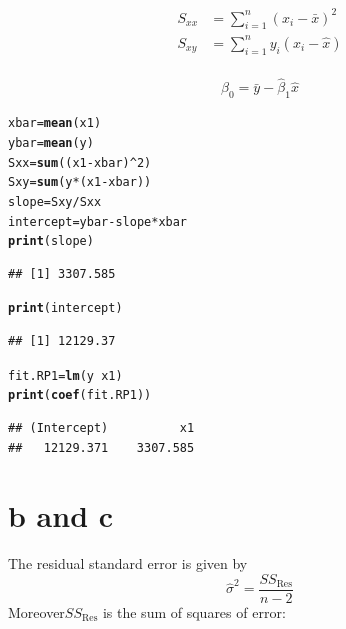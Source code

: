 \documentclass{article}\usepackage[]{graphicx}\usepackage[]{color}
\makeatletter
\newcommand{\hlnum}[1]{\textcolor[rgb]{0.686,0.059,0.569}{#1}}%
\newcommand{\hlopt}[1]{\textcolor[rgb]{0,0,0}{#1}}%
\newcommand{\hlstd}[1]{\textcolor[rgb]{0.345,0.345,0.345}{#1}}%
\newcommand{\hlkwb}[1]{\textcolor[rgb]{0.69,0.353,0.396}{#1}}%
\newcommand{\hlkwd}[1]{\textcolor[rgb]{0.737,0.353,0.396}{\textbf{#1}}}%
\newenvironment{kframe}{%
 \def\at@end@of@kframe{}%
 \ifinner\ifhmode%
  \def\at@end@of@kframe{\end{minipage}}%
  \begin{minipage}{\columnwidth}%
 \fi\fi%
 \def\FrameCommand##1{\hskip\@totalleftmargin \hskip-\fboxsep
 \colorbox{shadecolor}{##1}\hskip-\fboxsep
     \hskip-\linewidth \hskip-\@totalleftmargin \hskip\columnwidth}%
 \MakeFramed {\advance\hsize-\width
   \@totalleftmargin\z@ \linewidth\hsize
   \@setminipage}}%
 {\par\unskip\endMakeFramed%
 \at@end@of@kframe}
\newenvironment{knitrout}{}{} %
\makeatother
\begin{document}
\begin{align} S_{xx}  &= \sum_{i=1}^{n}(x_i - \bar x)^2\\[2ex]
S_{xy} &= \sum_{i=1}^{n}y_i(x_i-\hat x) 
\end{align}\\[1ex]

\begin{equation} \hat\beta_0 = \bar y - \hat\beta_1 \hat x \end{equation}

\begin{knitrout}
\color{fgcolor}\begin{kframe}
\begin{alltt}
\hlstd{xbar} \hlkwb{=} \hlkwd{mean}\hlstd{(x1)}
\hlstd{ybar} \hlkwb{=} \hlkwd{mean}\hlstd{(y)}
\hlstd{Sxx} \hlkwb{=} \hlkwd{sum}\hlstd{((x1} \hlopt{-} \hlstd{xbar)}\hlopt{^}\hlnum{2}\hlstd{)}
\hlstd{Sxy} \hlkwb{=} \hlkwd{sum}\hlstd{(y}\hlopt{*}\hlstd{(x1} \hlopt{-} \hlstd{xbar))}
\hlstd{slope} \hlkwb{=} \hlstd{Sxy}\hlopt{/}\hlstd{Sxx}
\hlstd{intercept} \hlkwb{=} \hlstd{ybar} \hlopt{-} \hlstd{slope}\hlopt{*}\hlstd{xbar}
\hlkwd{print}\hlstd{(slope)}
\end{alltt}
\begin{verbatim}
## [1] 3307.585
\end{verbatim}
\begin{alltt}
\hlkwd{print}\hlstd{(intercept)}
\end{alltt}
\begin{verbatim}
## [1] 12129.37
\end{verbatim}
\begin{alltt}
\hlstd{fit.RP1} \hlkwb{=} \hlkwd{lm}\hlstd{(y}\hlopt{~}\hlstd{x1)}
\hlkwd{print}\hlstd{(}\hlkwd{coef}\hlstd{(fit.RP1))}
\end{alltt}
\begin{verbatim}
## (Intercept)          x1 
##   12129.371    3307.585
\end{verbatim}
\end{kframe}
\end{knitrout}

\clearpage

\section*{b and c}

The residual standard error is given by 
\begin{equation} \hat \sigma ^2 = \frac{SS_{\mathrm{Res}}}{n-2} \end{equation}
Moreover$SS_{\mathrm{Res}}$ is the sum of squares of error:
\end{document}
